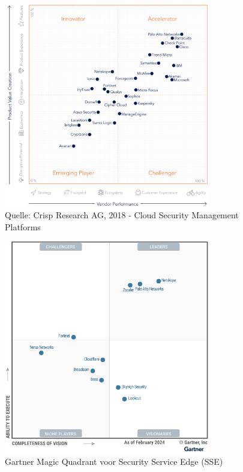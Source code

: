 \begin{figure}[h]
    \centering
    \includegraphics[width=0.8\textwidth]{img/netskopeinnovator.png}
    \caption{Quelle: Crisp Research AG, 2018 - Cloud Security Management Platforms \autocite{Hille2018}}
    \label{fig:netskope}
\end{figure}

\begin{figure}[h]
    \centering
    \includegraphics[width=0.8\textwidth]{img/netskope2024.png}
    \caption{Gartner Magic Quadrant voor Security Service Edge (SSE) \autocite{Gartner2024}}
    \label{fig:netskope2024}
\end{figure}


